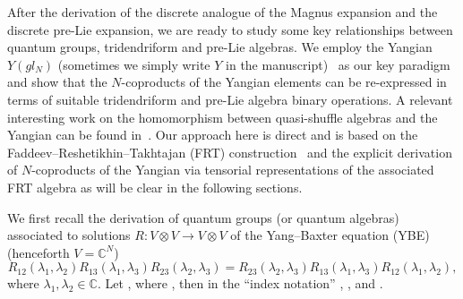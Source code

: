 \documentclass[10pt,a4paper]{amsart}
\numberwithin{equation}{section}
\theoremstyle{definition}
\DeclareMathOperator{\EEnd}{End}%
\def\mathfrak#1{#1}%
\def\mathcal#1{#1}%
\begin{document}
 After the derivation of the discrete analogue of the Magnus expansion and the discrete pre-Lie expansion, we are ready to study some key relationships between quantum groups, tridendriform and pre-Lie algebras. We employ the Yangian ${\mathcal Y}(\mathfrak{gl}_{\mathcal N})$ (sometimes we simply write ${\mathcal Y}$ in the manuscript)~\cite{Chari, Drinfeld, Drinfeld1, Drinfeld2, Molev} as our key paradigm and show that the $N$-coproducts of the Yangian elements can be re-expressed in terms of suitable tridendriform and pre-Lie algebra binary operations. A relevant interesting work on the homomorphism between quasi-shuffle algebras and the Yangian can be found in~\cite{Hudson}.
Our approach here is direct and is based on the Faddeev--Reshetikhin--Takhtajan (FRT) construction~\cite{FadTakRes} and the explicit derivation of $N$-coproducts of the Yangian via tensorial representations of the associated FRT algebra as will be clear in the following sections.

We first recall the derivation of quantum groups (or quantum algebras) associated to solutions $R\colon V \otimes V \to V \otimes V $ of the Yang--Baxter equation (YBE)~\cite{Baxter, Yang} \big(henceforth $V = {\mathbb C}^{{\mathcal N}}$\big)
\begin{equation}
R_{12}(\lambda_1, \lambda_2)R_{13}(\lambda_1, \lambda_3)R_{23}(\lambda_2, \lambda_3)= R_{23}(\lambda_2, \lambda_3) R_{13}(\lambda_1, \lambda_3) R_{12}(\lambda_1,\lambda_2), \label{frt}
\end{equation}
where $\lambda_1, \lambda_2 \in {\mathbb C}$. Let , where \smash{${\mathrm a}_x, {\mathrm b}_x\in \EEnd\bigl({\mathbb C}^{\mathcal N}\bigr)$}, then in the ``index notation'' , , and .
\end{document}
